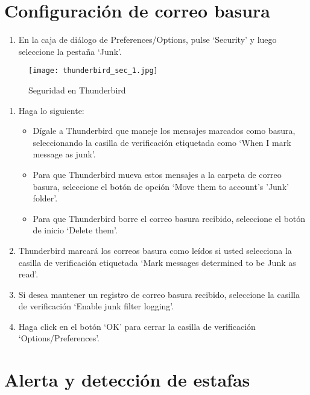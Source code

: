 \documentclass[10pt,a5paper,twoside,,]{book}
\providecommand{\tightlist}{%
  \setlength{\itemsep}{0pt}\setlength{\parskip}{0pt}}
\begin{document}
\section{Configuración de correo
basura}\label{configuraciuxf3n-de-correo-basura}

\begin{enumerate}
\def\labelenumi{\arabic{enumi}.}
\tightlist
\item
  En la caja de diálogo de Preferences/Options, pulse `Security' y luego
  seleccione la pestaña `Junk'.
\end{enumerate}

\begin{figure}[htbp]
\centering
\texttt{[image: thunderbird\_sec\_1.jpg]}
\caption{Seguridad en Thunderbird}
\end{figure}

\begin{enumerate}
\def\labelenumi{\arabic{enumi}.}
\setcounter{enumi}{1}
\tightlist
\item
  Haga lo siguiente:

  \begin{itemize}
  \tightlist
  \item
    Dígale a Thunderbird que maneje los mensajes marcados como basura,
    seleccionando la casilla de verificación etiquetada como `When I
    mark message as junk'.
  \item
    Para que Thunderbird mueva estos mensajes a la carpeta de correo
    basura, seleccione el botón de opción `Move them to account's 'Junk'
    folder'.
  \item
    Para que Thunderbird borre el correo basura recibido, seleccione el
    botón de inicio `Delete them'.
  \end{itemize}
\item
  Thunderbird marcará los correos basura como leídos si usted selecciona
  la casilla de verificación etiquetada `Mark messages determined to be
  Junk as read'.
\item
  Si desea mantener un registro de correo basura recibido, seleccione la
  casilla de verificación `Enable junk filter logging'.
\item
  Haga click en el botón `OK' para cerrar la casilla de verificación
  `Options/Preferences'.
\end{enumerate}

\section{Alerta y detección de
estafas}\label{alerta-y-detecciuxf3n-de-estafas}
\end{document}
